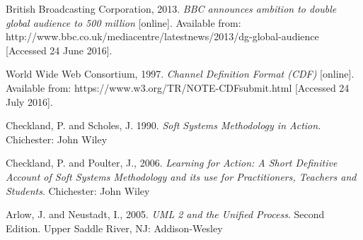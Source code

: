 \documentclass{article}
\begin{document}
\begin{thebibliography}{9}

British Broadcasting Corporation, 2013.
\textit{BBC announces ambition to double global audience to 500 million} [online].
Available from: http://www.bbc.co.uk/mediacentre/latestnews/2013/dg-global-audience [Accessed 24 June 2016].

World Wide Web Consortium, 1997.
\textit{Channel Definition Format (CDF)} [online].
Available from: https://www.w3.org/TR/NOTE-CDFsubmit.html
[Accessed 24 July 2016].

Checkland, P. and Scholes, J. 1990.
\textit{Soft Systems Methodology in Action}.
Chichester: John Wiley

Checkland, P. and Poulter, J., 2006.
\textit{Learning for Action: A Short Definitive Account of Soft Systems Methodology and its use for Practitioners, Teachers and Students}.
Chichester: John Wiley

Arlow, J. and Neustadt, I., 2005.
\textit{UML 2 and the Unified Process}. Second Edition. Upper Saddle River, NJ: Addison-Wesley

\end{thebibliography}
\end{document}
